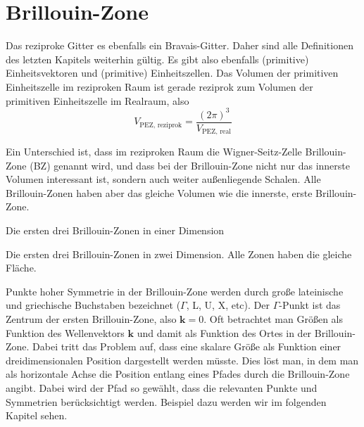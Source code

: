 \section{Brillouin-Zone}

Das reziproke Gitter es ebenfalls ein Bravais-Gitter. Daher sind alle Definitionen des letzten Kapitels weiterhin gültig. Es gibt also ebenfalls (primitive) Einheitsvektoren und (primitive) Einheitszellen. Das Volumen der primitiven Einheitszelle im reziproken Raum ist gerade reziprok zum Volumen der primitiven Einheitszelle im Realraum, also
\begin{equation}
V_\text{PEZ, reziprok} = \frac{(2 \pi)^3}{V_\text{PEZ, real} }
\end{equation}

Ein Unterschied ist, dass im reziproken Raum die Wigner-Seitz-Zelle Brillouin-Zone (BZ) genannt wird, und dass bei der Brillouin-Zone nicht nur das innerste Volumen interessant ist, sondern auch weiter außenliegende Schalen. Alle  Brillouin-Zonen haben aber das gleiche Volumen wie die innerste, erste  Brillouin-Zone.


\begin{marginfigure}

\caption{Die ersten drei Brillouin-Zonen in einer Dimension}
\end{marginfigure}

\begin{marginfigure}

\caption{Die ersten drei Brillouin-Zonen in zwei Dimension. Alle Zonen haben die gleiche Fläche.}
\end{marginfigure}

Punkte hoher Symmetrie in der Brillouin-Zone werden durch große lateinische und griechische Buchstaben bezeichnet ($\Gamma$, L, U, X, etc). Der $\Gamma$-Punkt ist das Zentrum der ersten Brillouin-Zone, also $\mathbf{k} = 0$. Oft betrachtet man Größen als Funktion des Wellenvektors  $\mathbf{k} $ und damit als Funktion des Ortes in der Brillouin-Zone. Dabei tritt das Problem auf, dass eine skalare Größe als Funktion einer dreidimensionalen Position dargestellt werden müsste. Dies löst man, in dem man als horizontale Achse die Position entlang eines Pfades durch die Brillouin-Zone angibt. Dabei wird der Pfad so gewählt, dass die relevanten Punkte und Symmetrien berücksichtigt werden. Beispiel dazu werden wir im folgenden Kapitel sehen.



